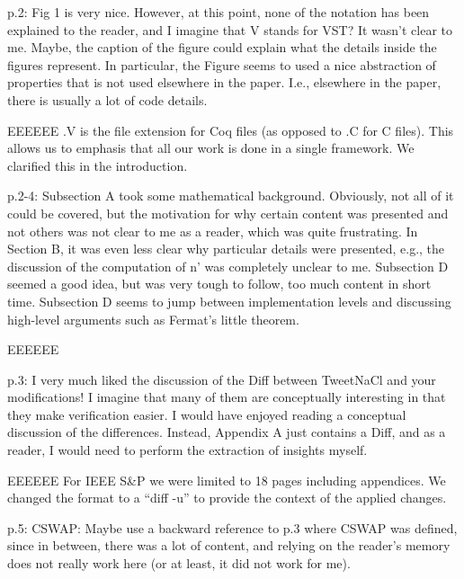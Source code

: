 p.2: Fig 1 is very nice. However, at this point, none of the notation has been
explained to the reader, and I imagine that V stands for VST? It wasn't clear to
me. Maybe, the caption of the figure could explain what the details inside the
figures represent. In particular, the Figure seems to used a nice abstraction of
properties that is not used elsewhere in the paper. I.e., elsewhere in the paper,
there is usually a lot of code details.

\begin{answer}{EEEEEE}
.V is the file extension for Coq files (as opposed to .C for C files).
This allows us to emphasis that all our work is done in a single framework.
We clarified this in the introduction.
\end{answer}

p.2-4: Subsection A took some mathematical background. Obviously, not all of it
could be covered, but the motivation for why certain content was presented and
not others was not clear to me as a reader, which was quite frustrating. In
Section B, it was even less clear why particular details were presented, e.g.,
the discussion of the computation of n' was completely unclear to me.
Subsection D seemed a good idea, but was very tough to follow, too much content
in short time. Subsection D seems to jump between implementation levels and
discussing high-level arguments such as Fermat's little theorem.

\begin{answer}{EEEEEE}
\end{answer}

p.3: I very much liked the discussion of the Diff between TweetNaCl and your
modifications! I imagine that many of them are conceptually interesting in that
they make verification easier. I would have enjoyed reading a conceptual
discussion of the differences. Instead, Appendix A just contains a Diff, and as
a reader, I would need to perform the extraction of insights myself.

\begin{answer}{EEEEEE}
For IEEE S\&P we were limited to 18 pages including appendices.
We changed the format to a ``diff -u'' to provide the context of
the applied changes.
\end{answer}

p.5: CSWAP: Maybe use a backward reference to p.3 where CSWAP was defined, since
in between, there was a lot of content, and relying on the reader's memory does
not really work here (or at least, it did not work for me).

